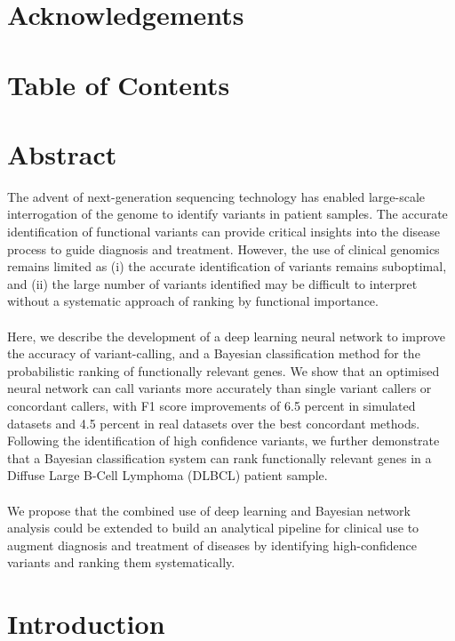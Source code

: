 \documentclass{article}
\begin{document}
\section*{Acknowledgements}
\newpage
\section*{Table of Contents}
\small
\tableofcontents
\newpage
\doublespace
\normalsize
{} 
\section*{Abstract}
The advent of next-generation sequencing technology has enabled large-scale interrogation of the genome to identify variants in patient samples. The accurate identification of functional variants can provide critical insights into the disease process to guide diagnosis and treatment. However, the use of clinical genomics remains limited as (i) the accurate identification of variants remains suboptimal, and (ii) the large number of variants identified may be difficult to interpret without a systematic approach of ranking by functional importance.\\\\
Here, we describe the development of a deep learning neural network to improve the accuracy of variant-calling, and a Bayesian classification method for the probabilistic ranking of functionally relevant genes. We show that an optimised neural network can call variants more accurately than single variant callers or concordant callers, with F1 score improvements of 6.5 percent in simulated datasets and 4.5 percent in real datasets over the best concordant methods. Following the identification of high confidence variants, we further demonstrate that a Bayesian classification system can rank functionally relevant genes in a Diffuse Large B-Cell Lymphoma (DLBCL) patient sample.\\\\
We propose that the combined use of deep learning and Bayesian network analysis could be extended to build an analytical pipeline for clinical use to augment diagnosis and treatment of diseases by identifying high-confidence variants and ranking them systematically.
\newpage
\section{Introduction}
\end{document}
